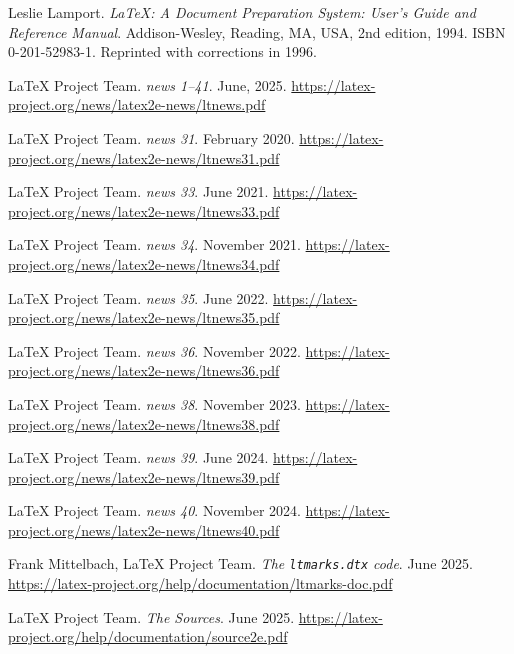 \documentclass{ltnews}
\begin{document}

\begin{thebibliography}{9}\frenchspacing


Leslie Lamport.
\newblock \emph{{\LaTeX}: {A} Document Preparation System: User's Guide and Reference
  Manual}.
\newblock \mbox{Addison}-Wesley, Reading, MA, USA, 2nd edition, 1994.
\newblock ISBN 0-201-52983-1.
\newblock Reprinted with corrections in 1996.

 \LaTeX{} Project Team.
  \emph{\LaTeXe{} news 1--41}. June, 2025.
  \url{https://latex-project.org/news/latex2e-news/ltnews.pdf}

 \LaTeX{} Project Team.
  \emph{\LaTeXe{} news 31}. February 2020.
  \url{https://latex-project.org/news/latex2e-news/ltnews31.pdf}

 \LaTeX{} Project Team.
  \emph{\LaTeXe{} news 33}. June 2021.
  \url{https://latex-project.org/news/latex2e-news/ltnews33.pdf}

 \LaTeX{} Project Team.
  \emph{\LaTeXe{} news 34}. November 2021.
  \url{https://latex-project.org/news/latex2e-news/ltnews34.pdf}

 \LaTeX{} Project Team.
  \emph{\LaTeXe{} news 35}. June 2022.
  \url{https://latex-project.org/news/latex2e-news/ltnews35.pdf}

 \LaTeX{} Project Team.
  \emph{\LaTeXe{} news 36}. November 2022.
  \url{https://latex-project.org/news/latex2e-news/ltnews36.pdf}

 \LaTeX{} Project Team.
  \emph{\LaTeXe{} news 38}. November 2023.
  \url{https://latex-project.org/news/latex2e-news/ltnews38.pdf}

 \LaTeX{} Project Team.
  \emph{\LaTeXe{} news 39}. June 2024.
  \url{https://latex-project.org/news/latex2e-news/ltnews39.pdf}

 \LaTeX{} Project Team.
  \emph{\LaTeXe{} news 40}. November 2024.
  \url{https://latex-project.org/news/latex2e-news/ltnews40.pdf}

 Frank Mittelbach, \LaTeX{} Project Team.
  \emph{The \texttt{ltmarks.dtx} code}. June 2025.
  \url{https://latex-project.org/help/documentation/ltmarks-doc.pdf}

 \LaTeX{} Project Team.
  \emph{The \LaTeXe{} Sources}. June 2025.
  \url{https://latex-project.org/help/documentation/source2e.pdf}

\end{thebibliography}
\end{document}
